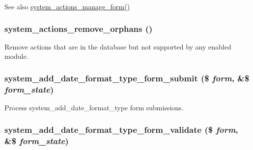 \begin{DoxySeeAlso}{See also}
\hyperlink{group__forms_gaa4836604ff53f110b7305b227cfb6344}{system\_\-actions\_\-manage\_\-form()} 
\end{DoxySeeAlso}
\hypertarget{system_8admin_8inc_aedf53f626d9575e7b779f6d5830e3cf5}{
\subsubsection[{system\_\-actions\_\-remove\_\-orphans}]{\setlength{\rightskip}{0pt plus 5cm}system\_\-actions\_\-remove\_\-orphans ()}}
\label{system_8admin_8inc_aedf53f626d9575e7b779f6d5830e3cf5}
Remove actions that are in the database but not supported by any enabled module. \hypertarget{system_8admin_8inc_a190e8dddd57c3106113f5f3836764267}{
\subsubsection[{system\_\-add\_\-date\_\-format\_\-type\_\-form\_\-submit}]{\setlength{\rightskip}{0pt plus 5cm}system\_\-add\_\-date\_\-format\_\-type\_\-form\_\-submit (\$ {\em form}, \/  \&\$ {\em form\_\-state})}}
\label{system_8admin_8inc_a190e8dddd57c3106113f5f3836764267}
Process system\_\-add\_\-date\_\-format\_\-type form submissions. \hypertarget{system_8admin_8inc_a527ad46f9809b020fc60a532b6cdaed9}{
\subsubsection[{system\_\-add\_\-date\_\-format\_\-type\_\-form\_\-validate}]{\setlength{\rightskip}{0pt plus 5cm}system\_\-add\_\-date\_\-format\_\-type\_\-form\_\-validate (\$ {\em form}, \/  \&\$ {\em form\_\-state})}}
